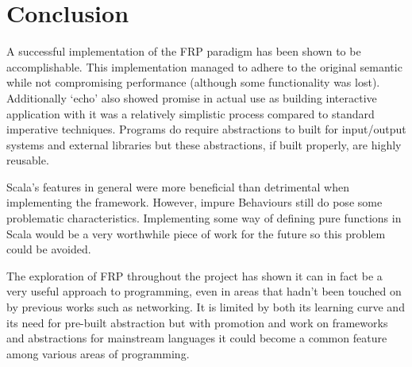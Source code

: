 \chapter{Conclusion}

A successful implementation of the FRP paradigm has been shown to be accomplishable. This implementation
managed to adhere to the original semantic while not compromising performance (although some functionality was
lost). Additionally `echo' also showed promise in actual use as building interactive application with it
was a relatively simplistic process compared to standard imperative techniques. Programs do require abstractions
to built for input/output systems and external libraries but these abstractions, if built properly, are highly
reusable.

Scala's features in general were more beneficial than detrimental when implementing the framework. However,
impure Behaviours still do pose some problematic characteristics. Implementing some way of defining pure functions
in Scala would be a very worthwhile piece of work for the future so this problem could be avoided.

The exploration of FRP throughout the project has shown it can in fact be a very useful approach to programming,
even in areas that hadn't been touched on by previous works such as networking. It is limited by
both its learning curve and its need for pre-built abstraction but with promotion and work on frameworks
and abstractions for mainstream languages it could become a common feature among various areas of programming.